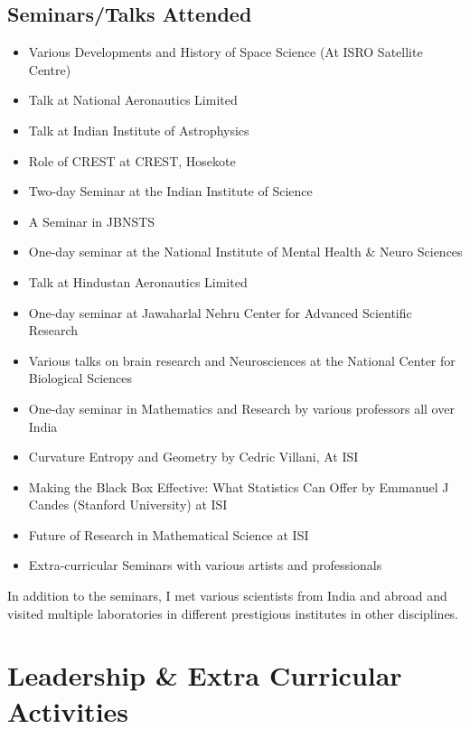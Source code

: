 \documentclass[11pt,a4paper]{article}
\begin{document}
\subsection{Seminars/Talks Attended}
\begin{itemize}[leftmargin=*]
  \item Various Developments and History of Space Science (At ISRO Satellite Centre)
  \item Talk at National Aeronautics Limited
  \item Talk at Indian Institute of Astrophysics
  \item Role of CREST at CREST, Hosekote
  \item Two-day Seminar at the Indian Institute of Science
  \item A Seminar in JBNSTS
  \item One-day seminar at the National Institute of Mental Health \& Neuro Sciences
  \item Talk at Hindustan Aeronautics Limited
  \item One-day seminar at Jawaharlal Nehru Center for Advanced Scientific Research
  \item Various talks on brain research and Neurosciences at the National Center for Biological Sciences
  \item One-day seminar in Mathematics and Research by various professors all over India
  \item Curvature Entropy and Geometry by Cedric Villani, At ISI
  \item Making the Black Box Effective: What Statistics Can Offer by Emmanuel J Candes (Stanford University) at ISI
  \item Future of Research in Mathematical Science at ISI
  \item Extra-curricular Seminars with various artists and professionals
\end{itemize}

\vspace{0.3cm}
In addition to the seminars, I met various scientists from India and abroad and visited multiple laboratories in different prestigious institutes in other disciplines.

\section{Leadership \& Extra Curricular Activities}
\end{document}
